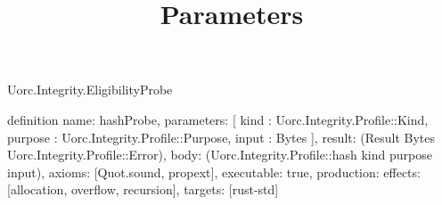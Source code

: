 \begin{lexlean}{Uorc.Integrity.EligibilityProbe}
\title{Parameters}
\begin{semanticmodule}
definition{
  name: hashProbe,
  parameters: [
    kind : Uorc.Integrity.Profile::Kind,
    purpose : Uorc.Integrity.Profile::Purpose,
    input : Bytes
  ],
  result: (Result Bytes Uorc.Integrity.Profile::Error),
  body: (Uorc.Integrity.Profile::hash kind purpose input),
  axioms: [Quot.sound, propext],
  executable: true,
  production: {effects: [allocation, overflow, recursion], targets: [rust-std]}
}
\end{semanticmodule}
\end{lexlean}
